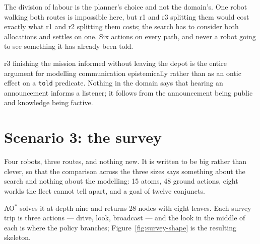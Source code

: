 \documentclass[11pt,a4paper]{article}
\begin{document}
The division of labour is the planner's choice and not the domain's. One robot
walking both routes is impossible here, but \textsf{r1} and \textsf{r3}
splitting them would cost exactly what \textsf{r1} and \textsf{r2} splitting
them costs; the search has to consider both allocations and settles on one. Six
actions on every path, and never a robot going to see something it has already
been told.

\textsf{r3} finishing the mission informed without leaving the depot is the
entire argument for modelling communication epistemically rather than as an
ontic effect on a \texttt{told} predicate. Nothing in the domain says that
hearing an announcement informs a listener; it follows from the announcement
being public and knowledge being factive.

\section{Scenario 3: the survey}
\label{sec:survey}

Four robots, three routes, and nothing new. It is written to be big rather than
clever, so that the comparison across the three sizes says something about the
search and nothing about the modelling: 15 atoms, 48 ground actions, eight
worlds the fleet cannot tell apart, and a goal of twelve conjuncts.

AO$^{*}$ solves it at depth nine and returns 28 nodes with eight leaves. Each
survey trip is three actions --- drive, look, broadcast --- and the look in the
middle of each is where the policy branches; Figure~\ref{fig:survey-shape} is
the resulting skeleton.
\end{document}

